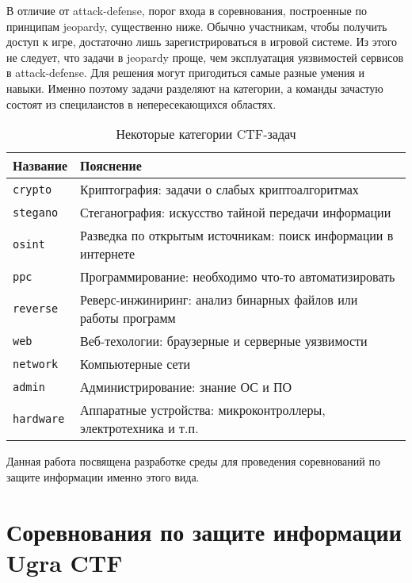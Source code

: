 В отличие от attack-defense, порог входа в соревнования, построенные по принципам jeopardy, существенно ниже. Обычно участникам, чтобы получить доступ к игре, достаточно лишь зарегистрироваться в игровой системе. Из этого не следует, что задачи в jeopardy проще, чем эксплуатация уязвимостей сервисов в attack-defense. Для решения могут пригодиться самые разные умения и навыки. Именно поэтому задачи разделяют на категории, а команды зачастую состоят из специлаистов в непересекающихся областях.

\begin{center}
  \begin{longtable}{|p{}|p{}|}
    \caption{Некоторые категории CTF-задач}
    \label{tab:categories}
    \\ \hline
    Название & Пояснение
    \\ \hline \endhead
    \texttt{crypto}   & Криптография: задачи о слабых криптоалгоритмах \\
    \texttt{stegano}  & Стеганография: искусство тайной передачи информации \\
    \texttt{osint}    & Разведка по открытым источникам: поиск информации в интернете \\
    \texttt{ppc}      & Программирование: необходимо что-то автоматизировать \\
    \texttt{reverse}  & Реверс-инжиниринг: анализ бинарных файлов или работы программ \\
    \texttt{web}      & Веб-техологии: браузерные и серверные уязвимости \\
    \texttt{network}  & Компьютерные сети \\
    \texttt{admin}    & Администрирование: знание ОС и ПО \\
    \texttt{hardware} & Аппаратные устройства: микроконтроллеры, электротехника и т.п. \\
    \hline
  \end{longtable}
\end{center}


Данная работа посвящена разработке среды для проведения соревнований по защите информации именно этого вида.




\section{Соревнования по защите информации Ugra CTF}
\label{cha:analysis:ugractf}

